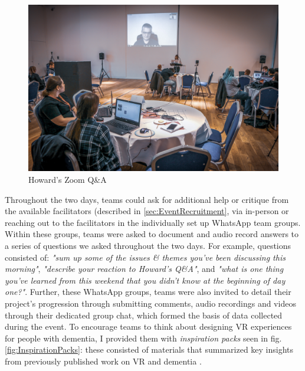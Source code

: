 \begin{figure}
\centering
\includegraphics[width=.8\linewidth]{Images/Howard.jpg}
\caption{Howard's Zoom Q\&A}
\label{fig:Howard}
\end{figure}

Throughout the two days, teams could ask for additional help or critique from the available facilitators (described in \ref{sec:EventRecruitment}, via in-person or reaching out to the facilitators in the individually set up WhatsApp team groups. Within these groups, teams were asked to document and audio record answers to a series of questions we asked throughout the two days. For example, questions consisted of: \textit{"sum up some of the issues \& themes you've been discussing this morning"}, \textit{"describe your reaction to Howard's Q\&A"}, and \textit{"what is one thing you've learned from this weekend that you didn't know at the beginning of day one?"}. Further, these WhatsApp groups, teams were also invited to detail their project's progression through submitting comments, audio recordings and videos through their dedicated group chat, which formed the basis of data collected during the event. To encourage teams to think about designing VR experiences for people with dementia, I provided them with \textit{inspiration packs} seen in fig.\ref{fig:InspirationPacks}: these consisted of materials that summarized key insights from previously published work on VR and dementia \citep{hodge_exploring_2018,hodge_exploring_2019}. 

